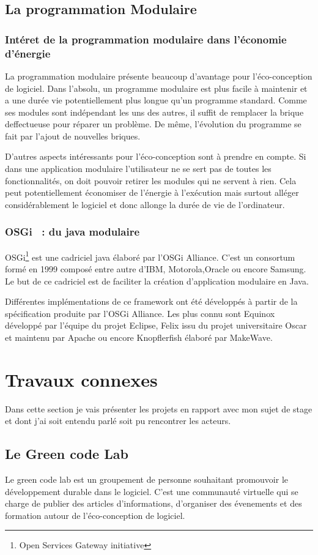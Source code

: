 \documentclass[a4paper, 11pt]{report}
\begin{document}
		\subsection{La programmation Modulaire}
			\subsubsection{Intéret de la programmation modulaire dans l'économie d'énergie}
La programmation modulaire présente beaucoup d'avantage pour l'éco-conception de logiciel. Dans l'absolu, un programme modulaire est plus facile à maintenir et a une durée vie potentiellement plus longue qu'un programme standard. Comme ses modules sont indépendant les uns des autres, il suffit de remplacer la brique deffectueuse pour réparer un problème. De même, l'évolution du programme se fait par l'ajout de nouvelles briques.

D'autres aspects intéressants pour l'éco-conception sont à prendre en compte. Si dans une application modulaire l'utilisateur ne se sert pas de toutes les fonctionnalités, on doit pouvoir retirer les modules qui ne servent à rien. Cela peut potentiellement économiser de l'énergie à l'exécution mais surtout alléger considérablement le logiciel et donc allonge la durée de vie de l'ordinateur.

			\subsubsection{OSGi ~: du java modulaire}
OSGi\footnote{Open Services Gateway initiative} est une cadriciel java élaboré par l'OSGi Alliance. C'est un consortum formé en 1999 composé entre autre d'IBM, Motorola,Oracle ou encore Samsung. Le but de ce cadriciel est de faciliter la création d'application modulaire en Java. 

Différentes implémentations de ce framework ont été développés à partir de la spécification produite par l'OSGi Alliance. Les plus connu sont Equinox développé par l’équipe du projet Eclipse, Felix issu du projet universitaire Oscar et maintenu par Apache ou encore Knopflerfish élaboré par MakeWave.
		
	\section{Travaux connexes}
Dans cette section je vais présenter les projets en rapport avec mon sujet de stage et dont j'ai soit entendu parlé soit pu rencontrer les acteurs.
		\subsection{Le Green code Lab}
Le green code lab est un groupement de personne souhaitant promouvoir le développement durable dans le logiciel. C'est une communauté virtuelle qui se charge de publier des articles d'informations, d'organiser des évenements et des formation autour de l'éco-conception de logiciel.
\end{document}
